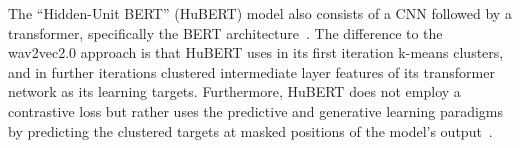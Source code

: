 The ``Hidden-Unit BERT'' (HuBERT) model also consists of a CNN followed by a transformer, specifically the BERT architecture~\cite{devlin2019bert}. The difference to the wav2vec2.0 approach is that HuBERT uses in its first iteration k-means clusters, and in further iterations clustered intermediate layer features of its transformer network as its learning targets. Furthermore, HuBERT does not employ a contrastive loss but rather uses the predictive and generative learning paradigms by predicting the clustered targets at masked positions of the model's output~\cite{hubert}.